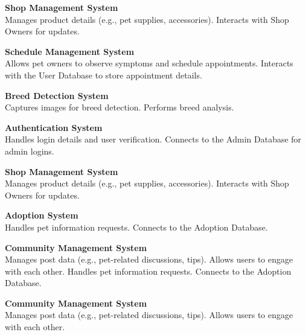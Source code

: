     \textbf{Shop Management System}\\
        Manages product details (e.g., pet supplies, accessories).
        Interacts with Shop Owners for updates.
    
    \textbf{Schedule Management System}\\
        Allows pet owners to observe symptoms and schedule appointments.
        Interacts with the User Database to store appointment details.
    
    \textbf{Breed Detection System}\\
        Captures images for breed detection.
        Performs breed analysis.
    
    \textbf{Authentication System}\\
        Handles login details and user verification.
        Connects to the Admin Database for admin logins.
    
    \textbf{Shop Management System}\\
        Manages product details (e.g., pet supplies, accessories).
        Interacts with Shop Owners for updates.
    
    \textbf{Adoption System}\\
        Handles pet information requests.
        Connects to the Adoption Database.
    
    \textbf{Community Management System}\\
        Manages post data (e.g., pet-related discussions, tips).
        Allows users to engage with each other.
        Handles pet information requests.
        Connects to the Adoption Database.
    
    \textbf{Community Management System}\\
        Manages post data (e.g., pet-related discussions, tips).
        Allows users to engage with each other.